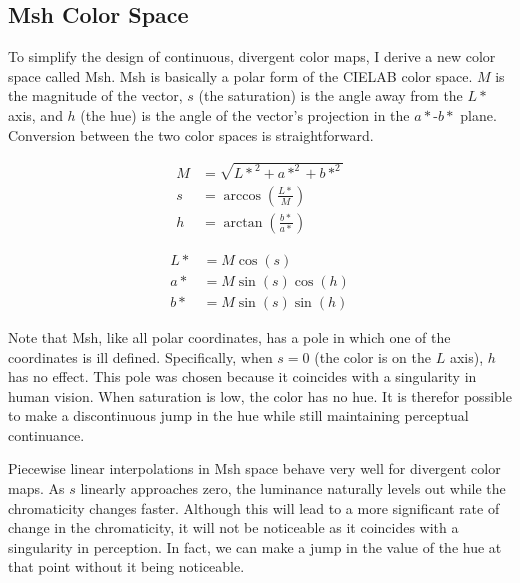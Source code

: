 \documentclass[twocolumn]{article}
\newcommand{\Lab}{CIELAB\xspace}
\newcommand{\Msh}{Msh\xspace}
\begin{document}
\subsection{\Msh Color Space}
\label{sec:MshColorSpace}

To simplify the design of continuous, divergent color maps, I derive a new
color space called \Msh.  \Msh is basically a polar form of the \Lab color
space.  $M$ is the magnitude of the vector, $s$ (the saturation) is the
angle away from the $L*$ axis, and $h$ (the hue) is the angle of the
vector's projection in the $a*$-$b*$ plane.  Conversion between the two
color spaces is straightforward.

\begin{equation}
  \begin{split}
    M &= \sqrt{{L*}^2 + a*^2 + b*^2} \\
    s &= \arccos\left(\frac{L*}{M}\right) \\
    h &= \arctan\left(\frac{b*}{a*}\right)
  \end{split}
  \label{eqn:LabToMsh}
\end{equation}

\begin{equation}
  \begin{split}
    L* &= M \cos\left(s\right) \\
    a* &= M \sin\left(s\right) \cos\left(h\right) \\
    b* &= M \sin\left(s\right) \sin\left(h\right)
  \end{split}
\end{equation}

Note that \Msh, like all polar coordinates, has a pole in which one of the
coordinates is ill defined.  Specifically, when $s = 0$ (the color is on
the $L$ axis), $h$ has no effect.  This pole was chosen because it
coincides with a singularity in human vision.  When saturation is low, the
color has no hue.  It is therefor possible to make a discontinuous jump
in the hue while still maintaining perceptual continuance.

Piecewise linear interpolations in \Msh space behave very well for
divergent color maps.  As $s$ linearly approaches zero, the luminance
naturally levels out while the chromaticity changes faster.  Although this
will lead to a more significant rate of change in the chromaticity, it will
not be noticeable as it coincides with a singularity in perception.  In
fact, we can make a jump in the value of the hue at that point without it
being noticeable.
\end{document}
